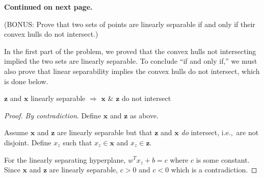 \noindent
\textbf{Continued on next page.}

\newpage
\begin{subproblem}
  (BONUS\@: Prove that two sets of points are linearly separable if and only if their convex hulls do not intersect.)
\end{subproblem}

In the first part of the problem, we proved that the convex hulls not intersecting implied the two sets are linearly separable.  To conclude ``if and only if,'' we must also prove that linear separability implies the convex hulls do not intersect, which is done below.

\begin{lemma}
  $\mathbf{z}$ and $\mathbf{x}$ linearly separable $\Rightarrow$ $\mathbf{x}$ \& $\mathbf{z}$ do not intersect
\end{lemma}

\begin{proof}
  \textit{By contradiction}.  Define $\mathbf{x}$ and $\mathbf{z}$ as above.

  Assume $\mathbf{x}$ and $\mathbf{z}$ are linearly separable but that $\mathbf{z}$ and $\mathbf{x}$ \textit{do} intersect, i.e.,~are not disjoint. Define $x_{z}$ such that $x_{z}\in\mathbf{x}$ and $x_z\in\mathbf{z}$.

  For the linearly separating hyperplane, $w^{T}x_{z}+b = c$ where $c$ is some constant.  Since $\mathbf{x}$ and $\mathbf{z}$ are linearly separable, $c>0$ and $c<0$ which is a contradiction.
\end{proof}
